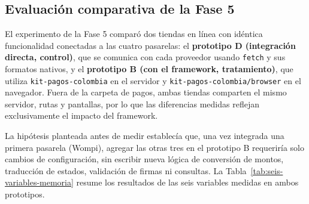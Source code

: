 \subsection{Evaluación comparativa de la Fase 5}
\label{sec:vii-evaluacion}

El experimento de la Fase 5 comparó dos tiendas en línea con idéntica funcionalidad conectadas a las cuatro pasarelas: el \textbf{prototipo D (integración directa, control)}, que se comunica con cada proveedor usando \texttt{fetch} y sus formatos nativos, y el \textbf{prototipo B (con el framework, tratamiento)}, que utiliza \texttt{kit-pagos-colombia} en el servidor y \texttt{kit-pagos-colombia/browser} en el navegador. Fuera de la carpeta de pagos, ambas tiendas comparten el mismo servidor, rutas y pantallas, por lo que las diferencias medidas reflejan exclusivamente el impacto del framework.

La hipótesis planteada antes de medir establecía que, una vez integrada una primera pasarela (Wompi), agregar las otras tres en el prototipo B requeriría solo cambios de configuración, sin escribir nueva lógica de conversión de montos, traducción de estados, validación de firmas ni consultas. La Tabla~\ref{tab:seis-variables-memoria} resume los resultados de las seis variables medidas en ambos prototipos.

